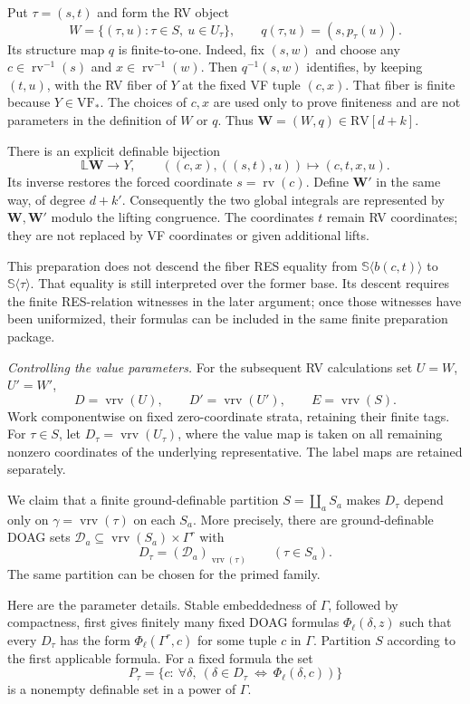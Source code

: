 \documentclass[12pt]{amsart}
\theoremstyle{remark}
\theoremstyle{definition}
\newcommand{\rv}{\operatorname{rv}}
\newcommand{\RV}{\mathrm{RV}}
\newcommand{\VF}{\mathrm{VF}}
\newcommand{\vrv}{\operatorname{vrv}}
\newcommand{\Sbase}{\mathbb S}
\numberwithin{equation}{section}
\theoremstyle{plain}
\begin{document}
{Put $\tau=(s,t)$ and form the RV object
\[
 W=\{(\tau,u):\tau\in S,\ u\in U_\tau\},\qquad
 q(\tau,u)=(s,p_\tau(u)).
\]
Its structure map $q$ is finite-to-one.
Indeed, fix $(s,w)$ and choose any
$c\in\rv^{-1}(s)$ and $x\in\rv^{-1}(w)$.
Then $q^{-1}(s,w)$ identifies, by keeping $(t,u)$, with the
RV fiber of $Y$ at the fixed VF tuple $(c,x)$.
That fiber is finite because $Y\in\VF_*$.
The choices of $c,x$ are used only to prove finiteness and
are not parameters in the definition of $W$ or $q$.
Thus $\bm W=(W,q)\in\RV[d+k]$.

There is an explicit definable bijection
\[
 \mathbb L\bm W\longrightarrow Y,\qquad
 ((c,x),((s,t),u))\longmapsto(c,t,x,u).
\]
Its inverse restores the forced coordinate $s=\rv(c)$.
Define $\bm W'$ in the same way, of degree $d+k'$.
Consequently the two global integrals are represented by
$\bm W,\bm W'$ modulo the lifting congruence.
The coordinates $t$ remain RV coordinates; they are not
replaced by VF coordinates or given additional lifts.

This preparation does not descend the fiber RES equality
from $\Sbase\langle b(c,t)\rangle$ to
$\Sbase\langle\tau\rangle$.
That equality is still interpreted over the former base.
Its descent requires the finite RES-relation witnesses in
the later argument; once those witnesses have been
uniformized, their formulas can be included in the same
finite preparation package.

\medskip
\noindent\emph{Controlling the value parameters.}
For the subsequent RV calculations set $U=W$, $U'=W'$,
\[
 D=\vrv(U),\qquad D'=\vrv(U'),\qquad E=\vrv(S).
\]
Work componentwise on fixed zero-coordinate strata,
retaining their finite tags.
For $\tau\in S$, let $D_\tau=\vrv(U_\tau)$,
where the value map is taken on all remaining nonzero
coordinates of the underlying representative.
The label maps are retained separately.

We claim that a finite ground-definable partition
$S=\coprod_a S_a$ makes $D_\tau$ depend only on
$\gamma=\vrv(\tau)$ on each $S_a$.
More precisely, there are ground-definable DOAG sets
$\mathcal D_a\subseteq\vrv(S_a)\times\Gamma^r$ with
\[
 D_\tau=(\mathcal D_a)_{\vrv(\tau)}
       \qquad(\tau\in S_a).
\]
The same partition can be chosen for the primed family.

Here are the parameter details.
Stable embeddedness of $\Gamma$, followed by compactness,
first gives finitely many fixed DOAG formulas
$\Phi_\ell(\delta,z)$ such that every $D_\tau$ has the form
$\Phi_\ell(\Gamma^r,c)$ for some tuple $c$ in $\Gamma$.
Partition $S$ according to the first applicable formula.
For a fixed formula the set
\[
 P_\tau=\{c:\ \forall\delta,\
       (\delta\in D_\tau\ \Longleftrightarrow\
                    \Phi_\ell(\delta,c))\}
\]
is a nonempty definable set in a power of $\Gamma$.

}
\end{document}
